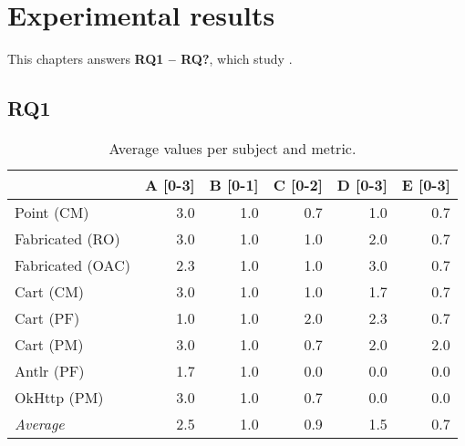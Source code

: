     \chapter{Experimental results}\label{chap:results}

This chapters answers \textbf{RQ1 – RQ?}, which study .

\section{RQ1}\label{sec:results:rq1}

\begin{table}[t]
\centering
\begin{tabular}{@{\extracolsep{\fill}} lrrrrr} \toprule
                 & A [0-3] & B [0-1] & C [0-2] & D [0-3] & E [0-3] \\
\midrule
Point (CM)       & 3.0 & 1.0 & 0.7 & 1.0 & 0.7 \\
Fabricated (RO)  & 3.0 & 1.0 & 1.0 & 2.0 & 0.7 \\
Fabricated (OAC) & 2.3 & 1.0 & 1.0 & 3.0 & 0.7 \\
Cart (CM)        & 3.0 & 1.0 & 1.0 & 1.7 & 0.7 \\
Cart (PF)        & 1.0 & 1.0 & 2.0 & 2.3 & 0.7 \\
Cart (PM)        & 3.0 & 1.0 & 0.7 & 2.0 & 2.0 \\
Antlr (PF)       & 1.7 & 1.0 & 0.0 & 0.0 & 0.0 \\
OkHttp (PM)      & 3.0 & 1.0 & 0.7 & 0.0 & 0.0 \\
\midrule
\textit{Average}  & 2.5 & 1.0 & 0.9 & 1.5 & 0.7 \\
\bottomrule
\end{tabular}
\caption{Average values per subject and metric.\label{tab:results:rq1}}
\end{table}

